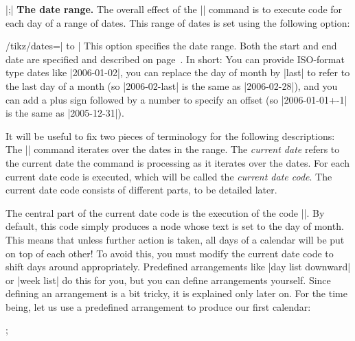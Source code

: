 \begin{command}{\calendar {}|;|}
    \medskip
    \textbf{The date range.}
    The overall effect of the |\calendar| command is to execute code for each
    day of a range of dates. This range of dates is set using the following
    option:
    \begin{key}{/tikz/dates=| to |}
        This option specifies the date range. Both the start and end date are
        specified and described on page~\pageref{calendar-date-format}. In
        short: You can provide ISO-format type dates like |2006-01-02|, you can
        replace the day of month by |last| to refer to the last day of a month
        (so |2006-02-last| is the same as |2006-02-28|), and you can add a plus
        sign followed by a number to specify an offset (so |2006-01-01+-1| is
        the same as |2005-12-31|).
    \end{key}
    It will be useful to fix two pieces of terminology for the following
    descriptions: The |\calendar| command iterates over the dates in the range.
    The \emph{current date} refers to the current date the command is
    processing as it iterates over the dates. For each current date code is
    executed, which will be called the \emph{current date code}. The current
    date code consists of different parts, to be detailed later.

    The central part of the current date code is the execution of the code
    |\tikzdaycode|. By default, this code simply produces a node whose text is
    set to the day of month. This means that unless further action is taken,
    all days of a calendar will be put on top of each other! To avoid this, you
    must modify the current date code to shift days around appropriately.
    Predefined arrangements like |day list downward| or |week list| do this for
    you, but you can define arrangements yourself. Since defining an
    arrangement is a bit tricky, it is explained only later on. For the time
    being, let us use a predefined arrangement to produce our first calendar:
\begin{codeexample}[preamble={\usetikzlibrary{calendar}}]
\tikz \calendar[dates=2000-01-01 to 2000-01-31,week list];
\end{codeexample}



\end{command}
